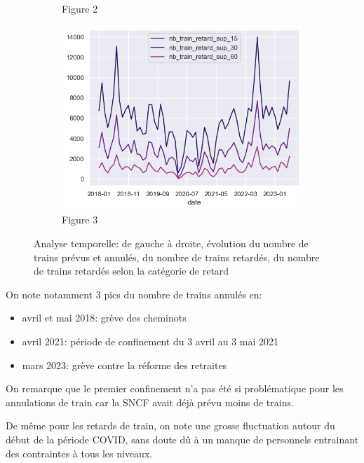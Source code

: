 \documentclass{article}
\begin{document}
\begin{figure}[H]
\begin{subfigure}{0.3\textwidth}
        \caption{Figure 2}
    \end{subfigure}
    \begin{subfigure}{0.3\textwidth}
        \includegraphics[width=\linewidth]{retard_cat_tmp.png}
        \caption{Figure 3}
    \end{subfigure}
    \caption{Analyse temporelle: de gauche à droite, évolution du nombre de trains prévus et annulés, du nombre de trains retardés, du nombre de trains retardés selon la catégorie de retard}
\end{figure}

On note notamment 3 pics du nombre de trains annulés en:
\begin{itemize}[label=\textbullet]
    \item avril et mai 2018: grève des cheminots
    \item avril 2021: période de confinement du 3 avril au 3 mai 2021
    \item mars 2023: grève contre la réforme des retraites
\end{itemize}

On remarque que le premier confinement n'a pas été si problématique pour les annulations de train car la SNCF avait déjà prévu moins de trains.

De même pour les retards de train, on note une grosse fluctuation autour du début de la période COVID, sans doute dû à un manque de personnels entrainant des contraintes à tous les niveaux. 
\end{document}
